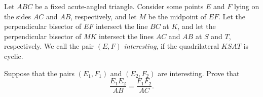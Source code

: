 Let $ABC$ be a fixed acute-angled triangle. Consider some points $E$ and $F$ lying on the sides $AC$ and $AB$, respectively, and let $M$ be the midpoint of $EF$. Let the perpendicular bisector of $EF$ intersect the line $BC$ at $K$, and let the perpendicular bisector of $MK$ intersect the lines $AC$ and $AB$ at $S$ and $T$, respectively. We call the pair $(E, F)$ \emph{interesting}, if the quadrilateral $KSAT$ is cyclic.

Suppose that the pairs $(E_1, F_1)$ and $(E_2, F_2)$ are interesting. Prove that
\[
\frac{E_1 E_2}{AB} = \frac{F_1 F_2}{AC}.
\]
